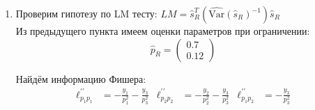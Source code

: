 \documentclass[12pt,letterpaper]{article}
\newcommand{\Var}{\mathrm{Var}}
\begin{document}
\begin{enumerate} [a)]
{\begin{enumerate} [1.]
{                Найдём максимум функции $\ell$ при $H_0$:
    
                $$\ell_{R}(y, p) = 75\ln 0.7 + 30 \ln p_2 + 45 \ln (1-0.7-p_2) + C$$
    
                $${\ell_{R}}^{\prime}_{p_2} = \frac{30}{p_2} - \frac{45}{0.3 - p_2} \longrightarrow \frac{30}{\hat{p_2}_{R}} - \frac{45}{0.3 - \hat{p_2}_{R}} = 0 \iff \hat{p_2}_{R} = 0.12$$
                
                Проверим, являются ли найденные значения точкой максимума, рассмотрев матрицу Гессе (вторые производные посчитаны в предыдущем пункте):
                $$ H(\hat{p}_{R}) =
                \begin{pmatrix}
                    -\frac{680000}{441} & -\frac{12500}{9} \\
                    -\frac{12500}{9} & -\frac{31250}{9}
                \end{pmatrix}
                \text{ - отрицательно определена} \implies \hat{p} \text{ - точка максимума}
                $$
                Подставим найденные оценки (для $\ell_{UR}$ оценка $\hat{p}_{ML}$ найдена в предыдущем пункте):
    
                $$LR = 2\big((75\ln 0.5 + 30 \ln 0.2 + 45 \ln 0.3) - (75\ln 0.7 + 30 \ln 0.12 + 45 \ln 0.18)\big) = 26.153$$
                
                $$\chi_{\text{crit}} = 3.84 < 26.153 \implies \text{ гипотеза опровергается}$$
            }
            \item
            {
                Проверим гипотезу по LM тесту: $LM = \hat{s}_{R}^T(\widehat{\Var}(\hat{s}_{R})^{-1})\hat{s}_{R}$\\
                
                Из предыдущего пункта имеем оценки параметров при ограничении:
                $$\hat{p}_{R} = \begin{pmatrix} 0.7 \\ 0.12 \end{pmatrix}$$
                
                Найдём информацию Фишера:
                \begin{align*}
                    \ell^{\prime\prime}_{p_1 p_1} &= -\frac{y_1}{p_1^2} - \frac{y_3}{p_3^2} & \ell^{\prime\prime}_{p_2 p_2} &= -\frac{y_2}{p_2^2} - \frac{y_3}{p_3^2} & \ell^{\prime\prime}_{p_1 p_2} &= - \frac{y_3}{p_3^2}
                \end{align*}
                
}
\end{enumerate}}
\end{enumerate}
\end{document}
